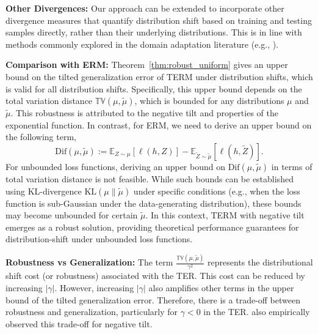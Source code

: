 \documentclass{article}
\theoremstyle{plain}
\theoremstyle{plain}
\theoremstyle{definition}
\theoremstyle{remark}
\newcommand{\KLr}{\mathrm{KL}}
\begin{document}
\textbf{Other Divergences:}
Our approach can be extended to incorporate other divergence measures that quantify distribution shift based on training and testing samples directly, rather than their underlying distributions. This is in line with methods commonly explored in the domain adaptation literature (e.g., \citep{ben2006analysis, zou2024towards, ye2021towards}).  

\textbf{Comparison with ERM:} Theorem~\ref{thm:robust_uniform} gives  an upper bound on the tilted generalization error of TERM under distribution shifts, which is valid for all distribution shifts. Specifically, this upper bound depends on the total variation distance $\mathbb{TV}(\mu, \tilde{\mu})$, which is bounded for any distributions $\mu$ and $\tilde{\mu}$. This robustness is attributed to the negative tilt and %
properties of the exponential function.
In contrast, for ERM, we need to derive an upper bound on the following term,
\begin{equation}
    \mathrm{Dif}(\mu,\tilde{\mu}):=\mathbb{E}_{Z\sim\mu}[\ell(h,Z)]-\mathbb{E}_{\tilde{Z}\sim\tilde{\mu}}[\ell(h,\tilde{Z})].
\end{equation}
For unbounded loss functions, deriving an upper bound on $\mathrm{Dif}(\mu,\tilde{\mu})$ in terms of total variation distance is not feasible. While such bounds can be established using KL-divergence $\KLr(\mu\|\tilde{\mu})$ under specific conditions (e.g., when the loss function is sub-Gaussian under the data-generating distribution), these bounds may become unbounded for certain $\tilde{\mu}$. In this context, TERM with negative tilt emerges as a robust solution, providing theoretical performance guarantees for distribution-shift under unbounded loss functions.

\textbf{Robustness vs Generalization:} The term $\frac{\mathbb{TV}(\mu,\tilde{\mu})}{\gamma^2 }$ represents the distributional shift cost (or robustness) associated with the TER. This cost can be reduced by increasing $|\gamma|$. However, increasing $|\gamma|$ also amplifies other terms in the upper bound of the tilted generalization error. Therefore, there is a trade-off between robustness and generalization, particularly for $\gamma<0$ in the TER. %
\citet{li2020tilted} also empirically observed this trade-off for negative tilt. 
\end{document}
